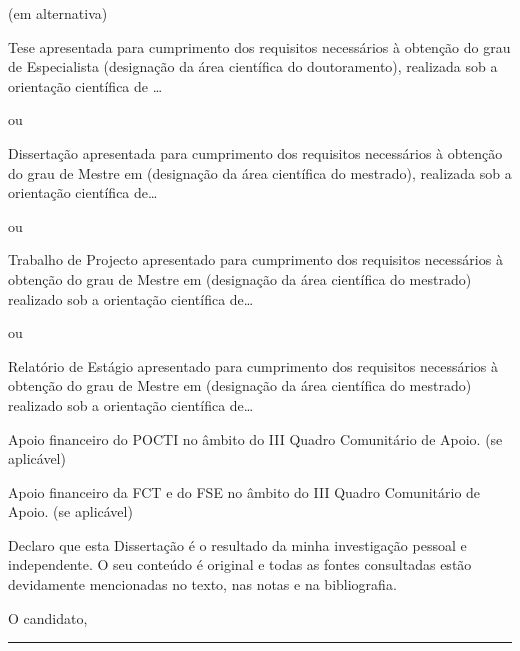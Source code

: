 \thispagestyle{empty}

(em alternativa)

Tese apresentada para cumprimento dos requisitos necessários à obtenção do grau de Especialista (designação da área científica do doutoramento), realizada sob a orientação científica de … 

ou

Dissertação apresentada para cumprimento dos requisitos necessários à obtenção do grau de Mestre em (designação da área científica do mestrado), realizada sob a orientação científica de…

ou

Trabalho de Projecto apresentado para cumprimento dos requisitos necessários à obtenção do grau de Mestre em (designação da área científica do mestrado) realizado sob a orientação científica de…

ou

Relatório de Estágio apresentado para cumprimento dos requisitos necessários à obtenção do grau de Mestre em (designação da área científica do mestrado) realizado sob a orientação científica de…

\vfill

Apoio financeiro do POCTI no âmbito do III Quadro Comunitário de Apoio.
(se aplicável)

Apoio financeiro da FCT e do FSE no âmbito do III Quadro Comunitário de Apoio.
(se aplicável)

\cleardoublepage

\thispagestyle{empty}

\null\vfill

Declaro que esta Dissertação é o resultado da minha investigação pessoal e independente. O seu conteúdo é original e todas as fontes consultadas estão devidamente mencionadas no texto, nas notas e na bibliografia.

\vspace{0.5cm}

\begin{center}
O candidato,
  
\vspace{1.5cm}

\rule{7.0cm}{1pt}
\end{center}

